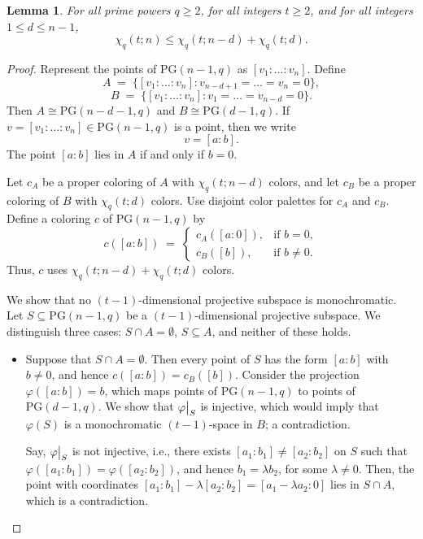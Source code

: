 \documentclass[11pt]{article}
\theoremstyle{plain}
\newtheorem{lemma}{Lemma}
\newcommand{\PG}{\mathrm{PG}}
\begin{document}
\begin{lemma}\label{lem:qtrecursion2}
For all prime powers $q\ge 2$, for all integers $t\ge2$, and for all integers $1\le d\le n-1$,
\begin{equation}
    \chi_q(t; n) \leq \chi_q(t; n - d) + \chi_q(t; d).
\end{equation}
\end{lemma}
\begin{proof}
Represent the points of $\PG(n-1,q)$ as $[v_1:\dots:v_n]$.
Define
\[
A \;=\; \bigl\{[v_1:\dots:v_n] : v_{n-d+1}=\dots=v_n=0\bigr\},
\]
\[
B \;=\; \bigl\{[v_1:\dots:v_n] : v_1=\dots=v_{n-d}=0\bigr\}.
\]
Then $A\cong\PG(n-d-1,q)$ and $B\cong\PG(d-1,q)$.
If $v=[v_1:\dots:v_n]  \in \PG(n-1,q)$ is a point, then we write
\[
v=[a:b].
\]
The point $[a:b]$ lies in $A$ if and only if $b=0$.

Let $c_A$ be a proper coloring of $A$ with $\chi_{q}(t;n-d)$ colors, and let $c_B$ be a proper coloring of $B$ with $\chi_q(t;d)$ colors.
Use disjoint color palettes for $c_A$ and $c_B$.
Define a coloring $c$ of $\PG(n-1,q)$ by
\[
c([a:b]) \;=\;
\begin{cases}
c_A([a:0]), & \text{if } b=0,\\[3pt]
c_B([b]),   & \text{if } b\ne 0.
\end{cases}
\]
Thus, $c$ uses $\chi_{q}(t;n-d)+\chi_q(t;d)$ colors.

We show that no $(t-1)$-dimensional projective subspace is monochromatic.
Let $S\subseteq\PG(n-1,q)$ be a $(t-1)$-dimensional projective subspace.
We distinguish three cases: $S\cap A=\emptyset$, $S\subseteq A$, and neither of these holds.

\begin{itemize}
    \item  Suppose that $S\cap A=\emptyset$.
    Then every point of $S$ has the form $[a:b]$ with $b\ne 0$, and hence $c([a:b])=c_B([b])$.
    Consider the projection $\varphi([a:b]) = b$, which maps points of $\PG(n-1,q)$ to points of $\PG(d-1,q)$.
    We show that $\varphi\big{|}_S$ is injective, which would imply that $\varphi(S)$ is a monochromatic $(t-1)$-space in $B$; a contradiction.
    
    Say, $\varphi\big{|}_S$ is not injective, i.e., there exists $[a_1:b_1] \neq [a_2:b_2]$ on $S$ such that $\varphi([a_1:b_1]) = \varphi([a_2:b_2]) $, and hence $b_1 = \lambda b_2$, for some $\lambda \neq 0$.
    Then, the point with coordinates $[a_1:b_1] - \lambda [a_2:b_2] = [a_1 - \lambda a_2:0]$ lies in $S \cap A$, which is a contradiction.
    

\end{itemize}
\end{proof}
\end{document}

